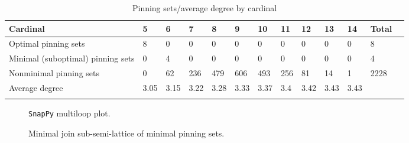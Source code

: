 \documentclass{article}%
\begin{document}
\begin{table}[ht]
	\caption{Pinning sets/average degree by cardinal}
	\centering
	\renewcommand{\arraystretch}{1.5}
	\begin{tabularx}{\textwidth}{lXXXXXXXXXXXX}
		\toprule
			Cardinal & 5 & 6 & 7 & 8 & 9 & 10 & 11 & 12 & 13 & 14 & Total\\
			\hline
			Optimal pinning sets & 8 & 0 & 0 & 0 & 0 & 0 & 0 & 0 & 0 & 0 & 8 \\
			Minimal (suboptimal) pinning sets & 0 & 4 & 0 & 0 & 0 & 0 & 0 & 0 & 0 & 0 & 4 \\
			Nonminimal pinning sets & 0 & 62 & 236 & 479 & 606 & 493 & 256 & 81 & 14 & 1 & 2228 \\
			Average degree & 3.05 & 3.15 & 3.22 & 3.28 & 3.33 & 3.37 & 3.4 & 3.42 & 3.43 & 3.43 &  \\
		\bottomrule \\ 
	\end{tabularx}
\end{table}

\begin{multicols}{2}
\begin{figure}[H]
\centering

\caption{\texttt{SnapPy} multiloop plot.}
\label{fig:tex/img/[[16, 20, 1, 17], [17, 8, 18, 7], [15, 10, 16, 11], [19, 9, 20, 10], [1, 9, 2, 8], [18, 2, 19, 3], [6, 24, 7, 21], [11, 24, 12, 23], [14, 3, 15, 4], [21, 14, 22, 13], [5, 12, 6, 13], [22, 4, 23, 5]].svg}
\end{figure}
\columnbreak

\begin{figure}[H]
\centering
\scalebox{0.8}{}
\caption{Minimal join sub-semi-lattice of minimal pinning sets.}
\label{fig:tex/img/[[16, 20, 1, 17], [17, 8, 18, 7], [15, 10, 16, 11], [19, 9, 20, 10], [1, 9, 2, 8], [18, 2, 19, 3], [6, 24, 7, 21], [11, 24, 12, 23], [14, 3, 15, 4], [21, 14, 22, 13], [5, 12, 6, 13], [22, 4, 23, 5]].pgf}
\end{figure}
\end{multicols}

\newpage
\end{document}
